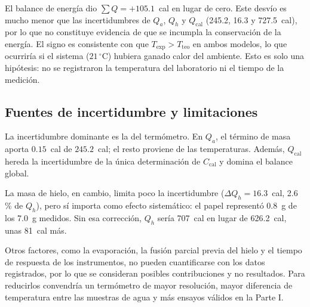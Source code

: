 El balance de energía dio $\sum Q=+105.1$~cal en lugar de
cero. Este desvío es mucho menor que las incertidumbres de
$Q_a$, $Q_h$ y $Q_{\mathrm{cal}}$ (245.2, 16.3 y 727.5~cal), por lo
que no constituye evidencia de que se incumpla la
conservación de la energía. El signo es consistente con que
$T_{\mathrm{exp}}>T_{\mathrm{teo}}$ en ambos modelos, lo que ocurriría si el
sistema ($21\,^{\circ}$C) hubiera ganado calor del
ambiente. Esto es solo una hipótesis: no se registraron
la temperatura del laboratorio ni el tiempo de la medición.

\subsection{Fuentes de incertidumbre y limitaciones}
La incertidumbre dominante es la del termómetro. En $Q_a$,
el término de masa aporta $0.15$~cal de $245.2$~cal; el
resto proviene de las temperaturas. Además, $Q_{\mathrm{cal}}$
hereda la incertidumbre de la única determinación de
$C_{\mathrm{cal}}$ y domina el balance global.

La masa de hielo, en cambio, limita poco la incertidumbre
($\Delta Q_h=16.3$~cal, 2.6\,\% de $Q_h$), pero sí
importa como efecto sistemático: el papel representó
0.8~g de los 7.0~g medidos. Sin esa corrección, $Q_h$
sería 707~cal en lugar de 626.2~cal, unas 81~cal más.

Otros factores, como la evaporación, la fusión parcial
previa del hielo y el tiempo de respuesta de los
instrumentos, no pueden cuantificarse con los datos
registrados, por lo que se consideran posibles
contribuciones y no resultados. Para reducirlos convendría
un termómetro de mayor resolución, mayor diferencia de
temperatura entre las muestras de agua y más ensayos
válidos en la Parte I.